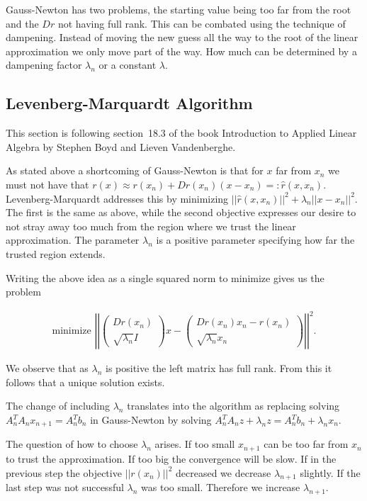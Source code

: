 Gauss-Newton has two problems, the starting value being too far from the root and the $Dr$ not having full rank. This can be combated using the technique of dampening. Instead of moving the new guess all the way to the root of the linear approximation we only move part of the way. How much can be determined by a dampening factor $\lambda_n$ or a constant $\lambda$.

\subsection{Levenberg-Marquardt Algorithm}

This section is following section~18.3 of the book Introduction to Applied Linear Algebra by Stephen Boyd and Lieven Vandenberghe\cite{TODO}.

As stated above a shortcoming of Gauss-Newton is that for $x$ far from $x_n$ we must not have that $r(x) \approx r(x_n) + Dr(x_n)(x-x_n) =: \hat{r}(x, x_n)$. Levenberg-Marquardt addresses this by minimizing $||\hat{r}(x, x_n)||^2 + \lambda_n ||x-x_n||^2$. The first is the same as above, while the second objective expresses our desire to not stray away too much from the region where we trust the linear approximation. The parameter $\lambda_n$ is a positive parameter specifying how far the trusted region extends.

Writing the above idea as a single squared norm to minimize gives us the problem

\begin{align*}
	\text{minimize }
	\left|\left|\left(\begin{matrix}
		Dr(x_n)\\ \sqrt{\lambda_n}I
	\end{matrix}\right) x - \left(\begin{matrix}
		Dr(x_n)x_n - r(x_n)\\ \sqrt{\lambda_n} x_n
	\end{matrix}\right)\right|\right|^2.
\end{align*}

We observe that as $\lambda_n$ is positive the left matrix has full rank. From this it follows that a unique solution exists.

The change of including $\lambda_n$ translates into the algorithm as replacing solving $A_n^TA_nx_{n+1} = A_n^Tb_n$ in Gauss-Newton by solving $A_n^T A_n z + \lambda_n z= A_n^T b_n + \lambda_n x_n$.

The question of how to choose $\lambda_n$ arises. If too small $x_{n+1}$ can be too far from $x_n$ to trust the approximation. If too big the convergence will be slow. If in the previous step the objective $||r(x_n)||^2$ decreased we decrease $\lambda_{n+1}$ slightly. If the last step was not successful $\lambda_n$ was too small. Therefore we increase $\lambda_{n+1}$.

